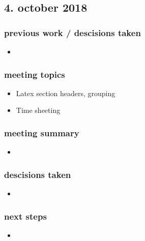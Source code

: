 \documentclass{article}
\begin{document}
        
    
\subsection{4. october 2018}

\subsubsection{previous work / descisions taken}
\begin{itemize}
    \item
\end{itemize}

\subsubsection{meeting topics}
\begin{itemize}
    \item Latex section headers, grouping
    \item Time sheeting
\end{itemize}

\subsubsection{meeting summary}
\begin{itemize}
    \item 
\end{itemize}

\subsubsection{descisions taken}
\begin{itemize}
    \item 
\end{itemize}

\subsubsection{next steps}
\begin{itemize}
    \item
\end{itemize}
\end{document}
